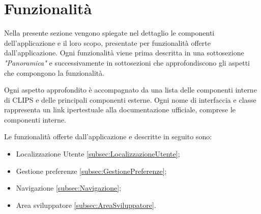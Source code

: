 \documentclass[../ManualeSviluppatore.tex]{subfiles}
\begin{document}
\section{Funzionalità}
	Nella presente sezione vengono spiegate nel dettaglio le componenti dell'applicazione e il loro scopo, presentate per funzionalità offerte dall'applicazione.
	Ogni funzionalità viene prima descritta in una sottosezione \textit{"Panoramica"} e successivamente in sottosezioni che approfondiscono gli aspetti che compongono la funzionalità. 
	
	Ogni aspetto approfondito è accompagnato da una lista delle componenti interne di CLIPS e delle principali componenti esterne. Ogni nome di interfaccia e classe rappresenta un link ipertestuale alla documentazione ufficiale, comprese le componenti interne. 
	
	Le funzionalità offerte dall'applicazione e descritte in seguito sono:
	\begin{itemize}
		\item Localizzazione Utente \ref{subsec:LocalizzazioneUtente};
		\item Gestione preferenze \ref{subsec:GestionePreferenze};
		\item Navigazione \ref{subsec:Navigazione};
		\item Area sviluppatore \ref{subsec:AreaSviluppatore}.
	\end{itemize}
	
	\newpage
		
	
	\newpage
		
	
	
	\newpage
		
	
	\newpage
		
\end{document}
